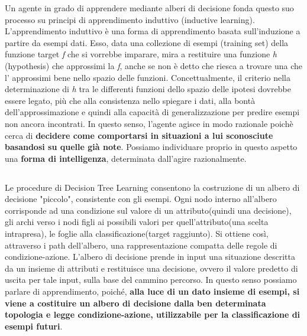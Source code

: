 			Un agente in grado di apprendere mediante alberi di decisione fonda questo suo processo su principi di apprendimento induttivo (\textsf{inductive learning}). L'apprendimento induttivo è una forma di apprendimento basata sull'induzione a partire da esempi dati. Esso, data una collezione di esempi (\textsf{training set}) della funzione \textsf{target} \emph{f} che si vorrebbe imparare, mira a restituire una funzione \emph{h} (\textsf{hypothesis}) che approssimi la \emph{f}, anche se non è detto che riesca a trovare una che l' approssimi bene nello spazio delle funzioni. Concettualmente, il criterio nella determinazione di \emph{h} tra le differenti funzioni dello spazio delle ipotesi dovrebbe essere legato, più che alla consistenza nello spiegare i dati, alla bontà dell'approssimazione e quindi alla capacità di generalizzazione per predire esempi non ancora incontrati. In questo senso, l'agente agisce in modo razionale poichè cerca di \textbf{decidere come comportarsi in situazioni a lui sconosciute basandosi su quelle già note}. Possiamo individuare proprio in questo aspetto una \textbf{forma di intelligenza}, determinata dall'agire razionalmente.
		\subsection{}
			Le procedure di \textsf{Decision Tree Learning} consentono la costruzione di un albero di decisione "piccolo", consistente con gli esempi. Ogni nodo interno all'albero corrisponde ad una condizione sul valore di un attributo(quindi una decisione), gli archi verso i nodi figli ai possibili valori per quell'attributo(una scelta intrapresa), le foglie alla classificazione(target raggiunto). Si ottiene così, attraverso i \textsf{path} dell'albero, una rappresentazione compatta delle regole di condizione-azione. L'albero di decisione prende in input una situazione descritta da un insieme di attributi e restituisce una decisione, ovvero il valore predetto di uscita per tale input, sulla base del cammino percorso. In questo senso possiamo parlare di apprendimento, poiché, \textbf{alla luce di un dato insieme di esempi, si viene a costituire un albero di decisione dalla ben determinata topologia e legge condizione-azione, utilizzabile per la classificazione di esempi futuri}.

